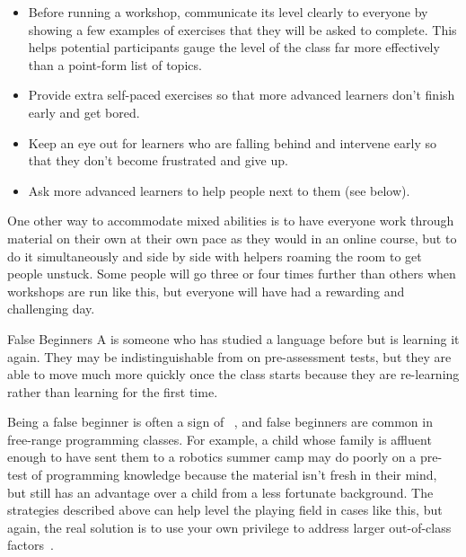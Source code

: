 \begin{itemize}

\item
  Before running a workshop,
  communicate its level clearly to everyone
  by showing a few examples of exercises that they will be asked to complete.
  This helps potential participants gauge the level of the class
  far more effectively than a point-form list of topics.

\item
  Provide extra self-paced exercises
  so that more advanced learners don't finish early and get bored.

\item
  Keep an eye out for learners who are falling behind
  and intervene early so that they don't become frustrated and give up.

\item
  Ask more advanced learners to help people next to them
  (see  below).

\end{itemize}

One other way to accommodate mixed abilities is
to have everyone work through material on their own at their own pace
as they would in an online course,
but to do it simultaneously and side by side
with helpers roaming the room to get people unstuck.
Some people will go three or four times further than others when workshops are run like this,
but everyone will have had a rewarding and challenging day.

\begin{aside}{False Beginners}
  A  is someone
  who has studied a language before but is learning it again.
  They may be indistinguishable from  on pre-assessment tests,
  but they are able to move much more quickly once the class starts
  because they are re-learning rather than learning for the first time.

  Being a false beginner is often a sign of ~\cite{Marg2010},
  and false beginners are common in free-range programming classes.
  For example,
  a child whose family is affluent enough to have sent them to a robotics summer camp
  may do poorly on a pre-test of programming knowledge
  because the material isn't fresh in their mind,
  but still has an advantage over a child from a less fortunate background.
  The strategies described above can help level the playing field in cases like this,
  but again,
  the real solution is to use your own privilege
  to address larger out-of-class factors~\cite{Part2011}.
\end{aside}

